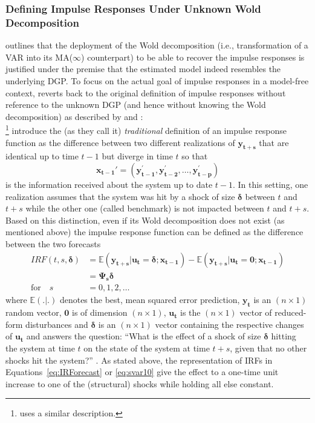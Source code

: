 \documentclass[a4paper,11pt,listof=nochaptergap,oneside,pointednumbers,bibtotoc,bigheadings,liststotoc]{scrbook}
\theoremstyle{mysatz}
\theoremstyle{mydefinition}
\theoremstyle{mybemerkung}
\renewcommand*{\paragraph}[1]{\subsubsection*{#1} \vspace{-3mm}} %
\newcommand{\vect}[1]{\boldsymbol{\mathbf{#1}}}
\begin{document}
\paragraph{Defining Impulse Responses Under Unknown Wold Decomposition}
\citet{jorda:05} outlines that the deployment of the Wold decomposition (i.e., transformation of a VAR into its MA($\infty$) counterpart) to be able to recover the impulse responses is justified under the premise that the estimated model indeed resembles the underlying DGP. To focus on the actual goal of impulse responses in a model-free context, \citet{jorda:05} reverts back to the original definition of impulse responses without reference to the unknown DGP (and hence without knowing the Wold decomposition) as described by \citet{koopetal:96} and \citet{hamilton:94}:\\
\citet{koopetal:96}\footnote{\citet{hamilton:94} uses a similar description.} introduce the (as they call it) \textit{traditional} definition of an impulse response function as the difference between two different realizations of $\vect{y_{t+s}}$ that are identical up to time $t-1$ but diverge in time $t$ so that 
\begin{equation}
	\vect{x_{t-1}'} = (\vect{y_{t-1}^'}, \vect{y_{t-2}^'}, \dots, \vect{y_{t-p}^'})
\end{equation}
is the information received about the system up to date $t-1$. In this setting, one realization assumes that the system was hit by a shock of size $\vect{\delta}$ between $t$ and $t+s$ while the other one (called benchmark) is not impacted between $t$ and $t+s$. Based on this distinction, even if its Wold decomposition does not exist (as mentioned above) the impulse response function can be defined as the difference between the two forecasts
\begin{equation}\label{eq:IRForecast}
\begin{split}
	IRF(t, s, \vect{\delta}) & = \mathbb{E}(\vect{y_{t+s}}|\vect{u_t}=\vect{\delta}; \vect{x_{t-1}}) - \mathbb{E}(\vect{y_{t+s}}|\vect{u_t}=\vect{0};\vect{x_{t-1}}) \\
	& = \vect{\Psi_s \delta} \\
	\text{for} \quad s & = 0, 1, 2, \dots
\end{split}
\end{equation}
where $\mathbb{E}(.|.)$ denotes the best, mean squared error prediction, $\vect{y_t}$ is an $(n \times 1)$ random vector, $\vect{0}$ is of dimension $(n \times 1)$, $\vect{u_t}$ is the $(n \times 1)$ vector of reduced-form disturbances and $\vect{\delta}$ is an $(n \times 1)$ vector containing the respective changes of $\vect{u_t}$ and answers the question: ``What is the effect of a shock of size $\vect{\delta}$ hitting the system at time $t$ on the state of the system at time $t+s$, given that no other shocks hit the system?'' \citep{koopetal:96}. As stated above, the representation of IRFs in Equations~\ref{eq:IRForecast} or \ref{eq:svar10} give the effect to a one-time unit increase to one of the (structural) shocks while holding all else constant. 
\end{document}
